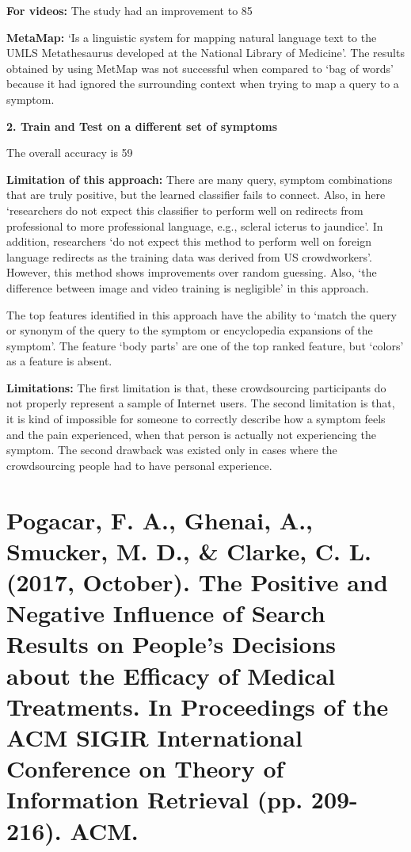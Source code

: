 \documentclass[]{article}
\begin{document}
\textbf{For videos:} The study had an improvement to 85%

\textbf{MetaMap:} ‘Is a linguistic system for mapping natural language text to the UMLS Metathesaurus developed at the National Library of Medicine’. The results obtained by using MetMap was not successful when compared to ‘bag of words’ because it had ignored the surrounding context when trying to map a query to a symptom.  

\textbf{2.	Train and Test on a different set of symptoms}

The overall accuracy is 59%

\textbf{Limitation of this approach:} There are many query, symptom combinations that are truly positive, but the learned classifier fails to connect. Also, in here ‘researchers do not expect this classifier to perform well on redirects from professional to more professional language, e.g., scleral icterus to jaundice’. In addition, researchers ‘do not expect this method to perform well on foreign language redirects as the training data was derived from US crowdworkers’. However, this method shows improvements over random guessing. Also, ‘the difference between image and video training is negligible’ in this approach.
  
The top features identified in this approach have the ability to ‘match the query or synonym of the query to the symptom or encyclopedia expansions of the symptom’. The feature ‘body parts’ are one of the top ranked feature, but ‘colors’ as a feature is absent. 

\textbf{Limitations:}  The first limitation is that, these crowdsourcing participants do not properly represent a sample of Internet users. The second limitation is that, it is kind of impossible for someone to correctly describe how a symptom feels and the pain experienced, when that person is actually not experiencing the symptom. The second drawback was existed only in cases where the crowdsourcing people had to have personal experience.     



\section{Pogacar, F. A., Ghenai, A., Smucker, M. D., & Clarke, C. L. (2017, October). The Positive and Negative Influence of Search Results on People's Decisions about the Efficacy of Medical Treatments. In Proceedings of the ACM SIGIR International Conference on Theory of Information Retrieval (pp. 209-216). ACM.}
\end{document}

